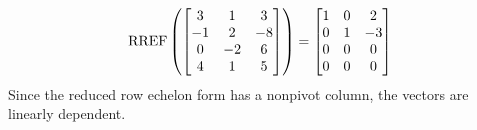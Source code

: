\documentclass{sbgLAquiz}
\begin{document}
\begin{solution}
$$\operatorname{RREF}\left(\begin{bmatrix} 3 & 1 & 3 \\ -1 & 2 & -8 \\ 0 & -2 & 6 \\ 4 & 1 & 5 \end{bmatrix} \right) = \begin{bmatrix} 1 & 0 & 2 \\ 0 & 1 & -3 \\ 0 & 0 & 0 \\ 0 & 0 & 0 \end{bmatrix}$$
Since the reduced row echelon form has a nonpivot column, the vectors are linearly dependent.
\end{solution}
\end{document}
